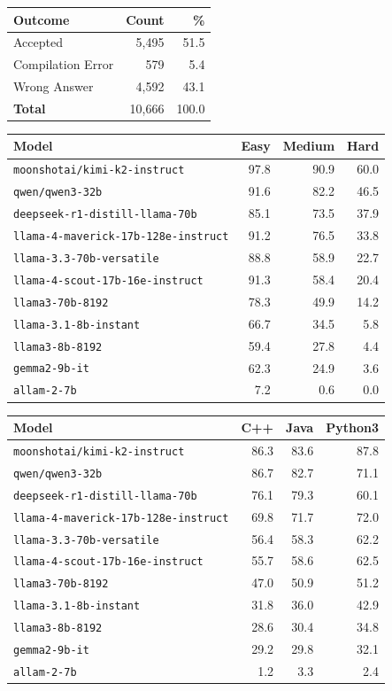 \begin{tabular}{lrr}
\hline\hline
\textbf{Outcome} & \textbf{Count} & \textbf{\%} \\
\hline
Accepted & 5{,}495 & 51.5 \\
Compilation Error & 579 & 5.4 \\
Wrong Answer & 4{,}592 & 43.1 \\
\hline
\textbf{Total} & 10{,}666 & 100.0 \\
\hline\hline
\end{tabular}

\begin{tabular}{lrrr}
\hline\hline
\textbf{Model} & \textbf{Easy} & \textbf{Medium} & \textbf{Hard} \\
\hline
\texttt{moonshotai/kimi-k2-instruct} & 97.8 & 90.9 & 60.0 \\
\texttt{qwen/qwen3-32b} & 91.6 & 82.2 & 46.5 \\
\texttt{deepseek-r1-distill-llama-70b} & 85.1 & 73.5 & 37.9 \\
\texttt{llama-4-maverick-17b-128e-instruct} & 91.2 & 76.5 & 33.8 \\
\texttt{llama-3.3-70b-versatile} & 88.8 & 58.9 & 22.7 \\
\texttt{llama-4-scout-17b-16e-instruct} & 91.3 & 58.4 & 20.4 \\
\texttt{llama3-70b-8192} & 78.3 & 49.9 & 14.2 \\
\texttt{llama-3.1-8b-instant} & 66.7 & 34.5 & 5.8 \\
\texttt{llama3-8b-8192} & 59.4 & 27.8 & 4.4 \\
\texttt{gemma2-9b-it} & 62.3 & 24.9 & 3.6 \\
\texttt{allam-2-7b} & 7.2 & 0.6 & 0.0 \\
\hline\hline
\end{tabular}

\begin{tabular}{lrrr}
\hline\hline
\textbf{Model} & \textbf{C++} & \textbf{Java} & \textbf{Python3} \\
\hline
\texttt{moonshotai/kimi-k2-instruct} & 86.3 & 83.6 & 87.8 \\
\texttt{qwen/qwen3-32b} & 86.7 & 82.7 & 71.1 \\
\texttt{deepseek-r1-distill-llama-70b} & 76.1 & 79.3 & 60.1 \\
\texttt{llama-4-maverick-17b-128e-instruct} & 69.8 & 71.7 & 72.0 \\
\texttt{llama-3.3-70b-versatile} & 56.4 & 58.3 & 62.2 \\
\texttt{llama-4-scout-17b-16e-instruct} & 55.7 & 58.6 & 62.5 \\
\texttt{llama3-70b-8192} & 47.0 & 50.9 & 51.2 \\
\texttt{llama-3.1-8b-instant} & 31.8 & 36.0 & 42.9 \\
\texttt{llama3-8b-8192} & 28.6 & 30.4 & 34.8 \\
\texttt{gemma2-9b-it} & 29.2 & 29.8 & 32.1 \\
\texttt{allam-2-7b} & 1.2 & 3.3 & 2.4 \\
\hline\hline
\end{tabular}

